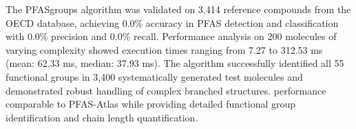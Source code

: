 
The PFASgroups algorithm was validated on 3,414 reference compounds from the OECD database, achieving 0.0\% accuracy in PFAS detection and classification with 0.0\% precision and 0.0\% recall. Performance analysis on 200 molecules of varying complexity showed execution times ranging from 7.27 to 312.53 ms (mean: 62.33 ms, median: 37.93 ms). The algorithm successfully identified all 55 functional groups in 3,400 systematically generated test molecules and demonstrated robust handling of complex branched structures. performance comparable to PFAS-Atlas while providing detailed functional group identification and chain length quantification.

